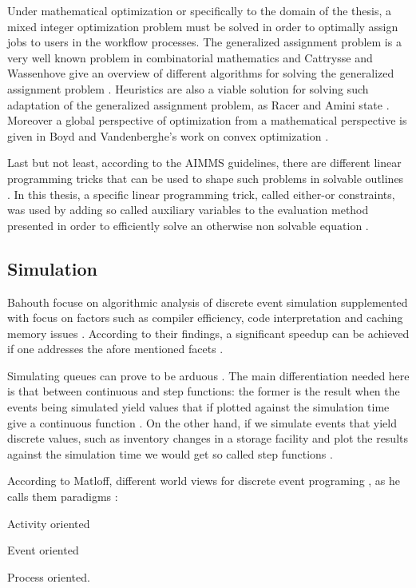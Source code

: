 \documentclass{seal_thesis}
\begin{document}
Under mathematical optimization or specifically to the domain of the thesis, a mixed integer optimization problem must be solved in order to optimally assign jobs to users in the workflow processes. The generalized assignment problem is a very well known problem in combinatorial mathematics and Cattrysse and Wassenhove give an overview of different algorithms for solving the generalized assignment problem \cite{Cattrysse1992}. Heuristics are also a viable solution for solving such adaptation of the generalized assignment problem, as Racer and Amini state \cite{Racer1994}. Moreover a global perspective of optimization from a mathematical perspective is given in Boyd and Vandenberghe's work on convex optimization \cite{Boyd2004}.

Last but not least, according to the AIMMS guidelines, there are different linear programming tricks that can be used to shape such problems in solvable outlines \cite{Bisschop2016}. In this thesis, a specific linear programming trick, called either-or constraints, was used by adding so called auxiliary variables to the evaluation method presented in order to efficiently solve an otherwise non solvable equation \cite[p. 77]{Bisschop2016}.

\subsection{Simulation}

Bahouth \etal focuse on algorithmic analysis of discrete event simulation supplemented with focus on factors such as compiler efficiency, code interpretation and caching memory issues \cite{Bahouth2007}. According to their findings, a significant speedup can be achieved if one addresses the afore mentioned facets \cite{Bahouth2007}.

Simulating queues can prove to be arduous \cite{Matloff2008}. The main differentiation needed here is that between continuous and step functions: the former is the result when the events being simulated yield values that if plotted against the simulation time give a continuous function \cite{Matloff2008}. On the other hand, if we simulate events that yield discrete values, such as inventory changes in a storage facility and plot the results against the simulation time we would get so called step functions \cite{Matloff2008}.

According to Matloff, different world views for discrete event programing \cite{Matloff2008}, as he calls them paradigms \cite{Matloff2008}:
\begin{enumerate*}
	\item Activity oriented
	\item Event oriented
	\item Process oriented.
\end{enumerate*}
\end{document}
